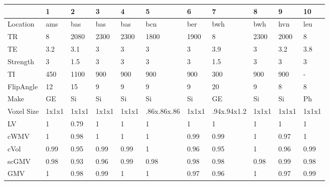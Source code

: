 \begin{table}
[]
\centering
\begin{tabular}{lllllllllll}
\toprule
{} &     1  &     2  &     3  &     4  &                    5  &     6  &                    7  &     8  &     9  &     10 \\
\midrule
Location & ams & bas & bas & bas & bcn & ber & bwh & bwh & hvn & leu\\
\midrule
TR                            &      8 &   2080 &   2300 &   2300 &                  1800 &   1900 &                     8 &   2300 &   2000 &      8 \\
TE                            &    3.2 &    3.1 &      3 &      3 &                     3 &      3 &                   3.9 &      3 &    3.2 &    3.8 \\
Strength                      &      3 &    1.5 &      3 &      3 &                     3 &      3 &                   1.5 &      3 &      3 &      3 \\
TI                            &    450 &   1100 &    900 &    900 &                   900 &    900 &                   300 &    900 &    900 &      - \\
FlipAngle                     &     12 &     15 &      9 &      9 &                     9 &      9 &                    20 &      9 &      8 &      8 \\
Make                          &     GE &     Si &     Si &     Si &                    Si &     Si &                    GE &     Si &     Si &     Ph \\
Voxel Size                    &  1x1x1 &  1x1x1 &  1x1x1 &  1x1x1 &  .86x.86x.86 &  1x1x1 &  .94x.94x1.2 &  1x1x1 &  1x1x1 &  1x1x1 \\
\bottomrule
LV             &      1 &   0.79 &      1 &      1 &                     1 &      1 &                     1 &      1 &      1 &      1 \\
cWMV        &      1 &   0.98 &      1 &      1 &                     1 &   0.99 &                  0.99 &      1 &   0.97 &      1 \\
cVol                   &   0.99 &   0.95 &   0.99 &   0.99 &                     1 &   0.96 &                  0.95 &      1 &   0.96 &   0.99 \\
scGMV                &   0.98 &   0.93 &   0.96 &   0.99 &                  0.98 &   0.98 &                  0.98 &   0.98 &   0.99 &   0.98 \\
GMV                  &      1 &   0.98 &   0.99 &      1 &                     1 &   0.97 &                  0.96 &      1 &   0.97 &   0.99 \\

\end{tabular}
\end{table}
